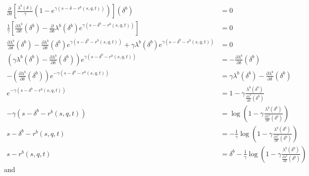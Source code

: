 \begin{align*}
    \frac{\partial}{\partial\delta}\left[\frac{\lambda^b(\delta)}{\gamma}(1-e^{\gamma(s-\delta-r^b(s,q,t))})\right](\delta^b)&=0\\
    \frac{1}{\gamma}\left[\frac{\partial\lambda^b}{\partial\delta}(\delta^b)-\frac{\partial}{\partial\delta}\lambda^b(\delta^b)e^{\gamma(s-\delta^b-r^b(s,q,t))}\right]&=0\\
    \frac{\partial\lambda^b}{\partial\delta}(\delta^b)-\frac{\partial\lambda^b}{\partial\delta}(\delta^b)e^{\gamma(s-\delta^b-r^b(s,q,t))}+\gamma\lambda^b(\delta^b)e^{\gamma(s-\delta^b-r^b(s,q,t))}&=0\\
    \left(\gamma\lambda^b(\delta^b)-\frac{\partial\lambda^b}{\partial\delta}(\delta^b)\right)e^{\gamma(s-\delta^b-r^b(s,q,t))}&=-\frac{\partial\lambda^b}{\partial\delta}(\delta^b)\\
    -\left(\frac{\partial\lambda^b}{\partial\delta}(\delta^b)\right)e^{-\gamma(s-\delta^b-r^b(s,q,t))}&=\gamma\lambda^b(\delta^b)-\frac{\partial\lambda^b}{\partial\delta}(\delta^b)\\
    e^{-\gamma(s-\delta^b-r^b(s,q,t))}&=1-\gamma\frac{\lambda^b(\delta^b)}{\frac{\partial\lambda^b}{\partial\delta}(\delta^b)}\\
    -\gamma(s-\delta^b-r^b(s,q,t))&=\log\left(1-\gamma\frac{\lambda^b(\delta^b)}{\frac{\partial\lambda^b}{\partial\delta}(\delta^b)}\right)\\
    s-\delta^b-r^b(s,q,t)&=-\frac{1}{\gamma}\log\left(1-\gamma\frac{\lambda^b(\delta^b)}{\frac{\partial\lambda^b}{\partial\delta}(\delta^b)}\right)\\
    s-r^b(s,q,t)&=\delta^b-\frac{1}{\gamma}\log\left(1-\gamma\frac{\lambda^b(\delta^b)}{\frac{\partial\lambda^b}{\partial\delta}(\delta^b)}\right)
\end{align*}
and
